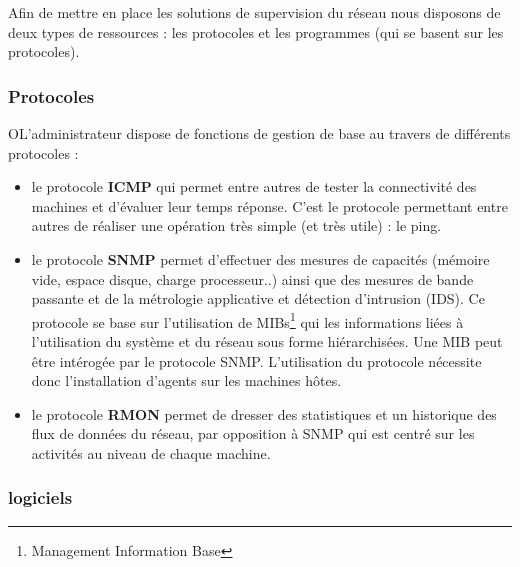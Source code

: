 \documentclass[a4paper]{article}
\begin{document}
Afin de mettre en place les solutions de supervision du réseau nous disposons de deux types de ressources : les protocoles et les programmes (qui se basent sur les protocoles).\\ 

\subsubsection{Protocoles}

OL'administrateur dispose de fonctions de gestion de base au travers de différents protocoles :
\begin{itemize}
\item le protocole \textbf{ICMP} qui permet entre autres de tester la connectivité des machines et d'évaluer leur temps réponse. C'est le protocole permettant entre autres de réaliser une opération très simple (et très utile) : le ping. 
\item le protocole \textbf{SNMP} permet d'effectuer des mesures de capacités (mémoire vide, espace disque, charge processeur..) ainsi que des mesures de bande passante et de la métrologie applicative et détection d'intrusion (IDS). Ce protocole se base sur l'utilisation de MIBs\footnote{Management Information Base} qui les informations liées à l'utilisation du système et du réseau sous forme hiérarchisées. Une MIB peut être intérogée par le protocole SNMP. L'utilisation du protocole nécessite donc l'installation d'agents sur les machines hôtes.
\item le protocole \textbf{RMON} permet de dresser des statistiques et un historique des flux de données du réseau, par opposition à SNMP qui est centré sur les activités au niveau de chaque machine.
\end{itemize}

\subsubsection{logiciels}
\end{document}
